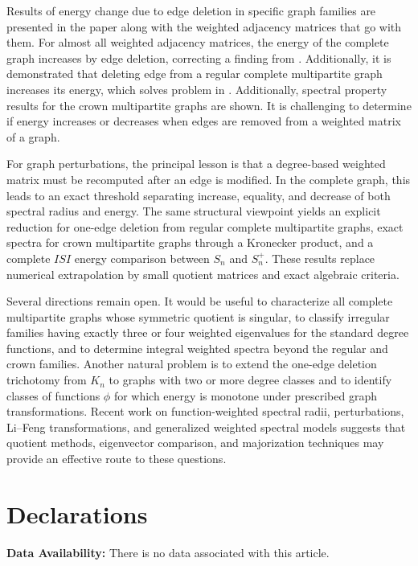 \documentclass[12pt,twoside]{article}
\begin{document}
Results of energy change due to edge deletion in specific graph families are presented in the paper along with the weighted adjacency matrices that go with them. For almost all weighted adjacency matrices, the energy of the complete graph increases by edge deletion, correcting a finding from \cite{bilalpak}.
Additionally, it is demonstrated that deleting edge from a regular complete multipartite graph increases its energy, which solves problem in \cite{bilalpak}.
Additionally, spectral property results for the crown multipartite graphs are shown. It is challenging to determine if energy increases or decreases when edges are removed from a weighted matrix of a graph.

For graph perturbations, the principal lesson is that a degree-based weighted matrix must be recomputed after an edge is modified. In the complete graph, this leads to an exact threshold separating increase, equality, and decrease of both spectral radius and energy. The same structural viewpoint yields an explicit reduction for one-edge deletion from regular complete multipartite graphs, exact spectra for crown multipartite graphs through a Kronecker product, and a complete $ISI$ energy comparison between $S_n$ and $S_n^+$. These results replace numerical extrapolation by small quotient matrices and exact algebraic criteria.

Several directions remain open. It would be useful to characterize all complete multipartite graphs whose symmetric quotient is singular, to classify irregular families having exactly three or four weighted eigenvalues for the standard degree functions, and to determine integral weighted spectra beyond the regular and crown families. Another natural problem is to extend the one-edge deletion trichotomy from $K_n$ to graphs with two or more degree classes and to identify classes of functions $\phi$ for which energy is monotone under prescribed graph transformations. Recent work on function-weighted spectral radii, perturbations, Li--Feng transformations, and generalized weighted spectral models \cite{LiZheng2025,GaoLiYangZheng2025,LiZheng2026} suggests that quotient methods, eigenvector comparison, and majorization techniques may provide an effective route to these questions.
   
  
 \section*{Declarations}
 \noindent \textbf{Data Availability:}	There is no data associated with this article.
 
\end{document}
